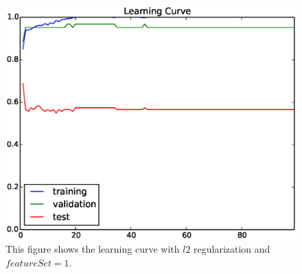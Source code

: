 \begin{figure}[hbtp]
\centering
\includegraphics[width=140mm]{learning_curve_l2_1}
\caption{This figure shows the learning curve with $l2$ regularization and $featureSet=1$.}
\label{fig:learning_curve_l2_1}
\end{figure}



